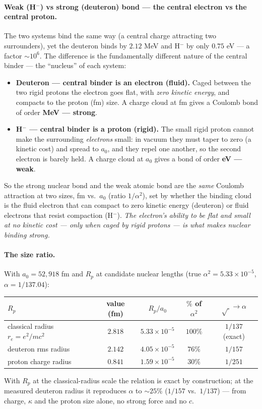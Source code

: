 \documentclass[11pt]{article}
\begin{document}
\paragraph{Weak (H$^-$) vs strong (deuteron) bond --- the central electron vs the central proton.} The two
systems bind the same way (a central charge attracting two surrounders), yet the deuteron binds by $2.12$ MeV
and H$^-$ by only $0.75$ eV --- a factor ${\sim}10^6$. The difference is the fundamentally different nature of
the central binder --- the ``nucleus'' of each system:
\begin{itemize}
\item \textbf{Deuteron --- central binder is an electron (fluid).} Caged between the two rigid protons the
electron goes flat, with \emph{zero kinetic energy}, and compacts to the proton (fm) size. A charge cloud at
fm gives a Coulomb bond of order \textbf{MeV --- strong}.
\item \textbf{H$^-$ --- central binder is a proton (rigid).} The small rigid proton cannot make the
surrounding \emph{electrons} small: in vacuum they must taper to zero (a kinetic cost) and spread to $a_0$,
and they repel one another, so the second electron is barely held. A charge cloud at $a_0$ gives a bond of
order \textbf{eV --- weak}.
\end{itemize}
So the strong nuclear bond and the weak atomic bond are the \emph{same} Coulomb attraction at two sizes, fm
vs.\ $a_0$ (ratio $1/\alpha^2$), set by whether the binding cloud is the fluid electron that can compact to
zero kinetic energy (deuteron) or fluid electrons that resist compaction (H$^-$). \emph{The electron's ability
to be flat and small at no kinetic cost --- only when caged by rigid protons --- is what makes nuclear binding
strong.}

\paragraph{The size ratio.} With $a_0=52{,}918$ fm and $R_p$ at candidate nuclear lengths
(true $\alpha^2=5.33\times10^{-5}$, $\alpha=1/137.04$):
\begin{center}
\begin{tabular}{lcccc}
\toprule
$R_p$ & value (fm) & $R_p/a_0$ & $\%$ of $\alpha^2$ & $\sqrt{\;}\to\alpha$ \\
\midrule
classical radius $r_e=e^2/mc^2$ & $2.818$ & $5.33\times10^{-5}$ & $100\%$ & $1/137$ (exact) \\
deuteron rms radius            & $2.142$ & $4.05\times10^{-5}$ & $76\%$  & $1/157$ \\
proton charge radius           & $0.841$ & $1.59\times10^{-5}$ & $30\%$  & $1/251$ \\
\bottomrule
\end{tabular}
\end{center}
With $R_p$ at the classical-radius scale the relation is exact by construction; at the measured deuteron
radius it reproduces $\alpha$ to ${\sim}25\%$ ($1/157$ vs.\ $1/137$) --- from charge, $\kappa$ and the proton
size alone, no strong force and no $c$.
\end{document}
